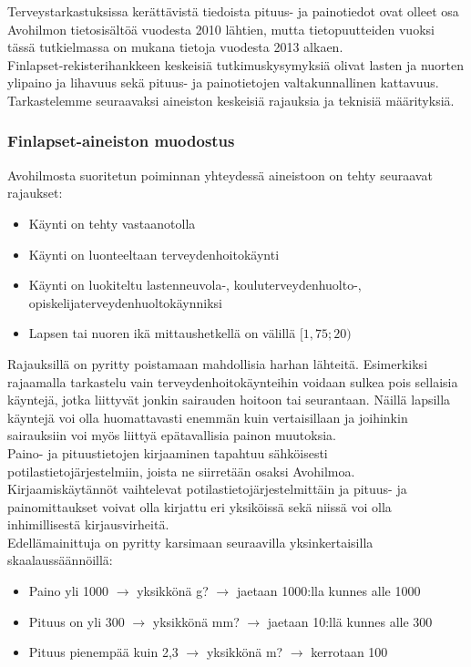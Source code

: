 \documentclass[finnish]{docopts}
\begin{document}
Terveystarkastuksissa kerättävistä tiedoista pituus- ja painotiedot ovat olleet osa Avohilmon tietosisältöä vuodesta 2010 lähtien, mutta tietopuutteiden vuoksi tässä tutkielmassa on mukana tietoja vuodesta 2013 alkaen. \\

Finlapset-rekisterihankkeen keskeisiä tutkimuskysymyksiä olivat lasten ja nuorten ylipaino ja lihavuus sekä pituus- ja painotietojen valtakunnallinen kattavuus. Tarkastelemme seuraavaksi aineiston keskeisiä rajauksia ja teknisiä määrityksiä. \\

\subsubsection{Finlapset-aineiston muodostus}
\label{ssb:finlapsetdatamuod}

Avohilmosta suoritetun poiminnan yhteydessä aineistoon on tehty seuraavat rajaukset:

\begin{itemize}
    \item Käynti on tehty vastaanotolla
    \item Käynti on luonteeltaan terveydenhoitokäynti
    \item Käynti on luokiteltu lastenneuvola-, kouluterveydenhuolto-, opiskelijaterveydenhuoltokäynniksi
    \item Lapsen tai nuoren ikä mittaushetkellä on välillä $[1,75;20)$
\end{itemize}

Rajauksillä on pyritty poistamaan mahdollisia harhan lähteitä. Esimerkiksi rajaamalla tarkastelu vain terveydenhoitokäynteihin voidaan sulkea pois sellaisia käyntejä, jotka liittyvät jonkin sairauden hoitoon tai seurantaan. Näillä lapsilla käyntejä voi olla huomattavasti enemmän kuin vertaisillaan ja joihinkin sairauksiin voi myös liittyä epätavallisia painon muutoksia. \\

Paino- ja pituustietojen kirjaaminen tapahtuu sähköisesti potilastietojärjestelmiin, joista ne siirretään osaksi Avohilmoa. Kirjaamiskäytännöt vaihtelevat potilastietojärjestelmittäin ja pituus- ja painomittaukset voivat olla kirjattu eri yksiköissä sekä niissä voi olla inhimillisestä kirjausvirheitä.\\

Edellämainittuja on pyritty karsimaan seuraavilla yksinkertaisilla skaalaussäännöillä:

\begin{itemize}
    \item Paino yli 1000 $\longrightarrow$ yksikkönä g?  $\longrightarrow$ jaetaan 1000:lla kunnes alle 1000
    \item Pituus on yli 300 $\longrightarrow$ yksikkönä mm? $\longrightarrow$ jaetaan 10:llä kunnes alle 300
    \item Pituus pienempää kuin 2,3 $\longrightarrow$ yksikkönä m? $\longrightarrow$ kerrotaan 100
\end{itemize}
\end{document}
